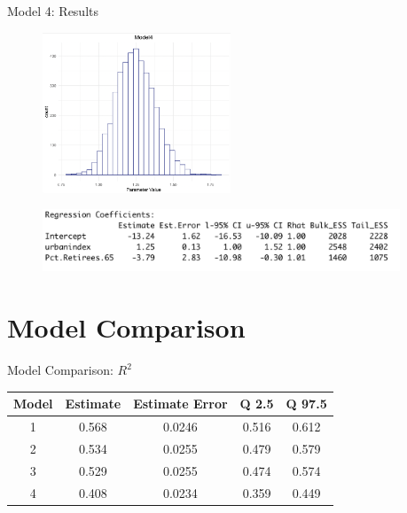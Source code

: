 \documentclass{beamer}
\begin{document}
\begin{frame}{Model 4: Results}
    \begin{figure}
        \includegraphics[width=0.5\textwidth]{plots/model4_postui.png}
    \end{figure}
    \begin{figure}
        \includegraphics[width=0.95\textwidth]{plots/model4_coeff.png}
    \end{figure}
\end{frame}






\section{Model Comparison}

\begin{frame}{Model Comparison: $R^2$ }
    \begin{center}
        
   
    \begin{tabular}{|c|c|c|c|c|}

        \hline
        Model & Estimate & Estimate Error & Q 2.5 & Q 97.5 \\
        \hline
        1 & 0.568   & 0.0246 & 0.516 & 0.612 \\
        2 & 0.534 & 0.0255&  0.479 & 0.579\\
        3 & 0.529 &  0.0255 &  0.474& 0.574 \\
        4 & 0.408 & 0.0234 & 0.359 & 0.449 \\
        \hline


    \end{tabular}  
\end{center}
\end{frame}
\end{document}
